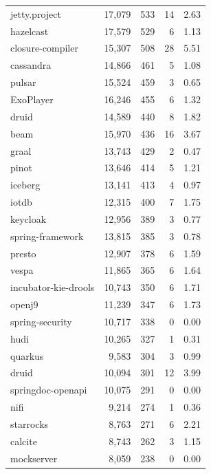 \begin{table}[!ht]
{\begin{tabular}{lrrrr}
jetty.project & 17,079 & 533 & 14 & 2.63 \\
hazelcast & 17,579 & 529 & 6 & 1.13 \\
closure-compiler & 15,307 & 508 & 28 & 5.51 \\
cassandra & 14,866 & 461 & 5 & 1.08 \\
pulsar & 15,524 & 459 & 3 & 0.65 \\
ExoPlayer & 16,246 & 455 & 6 & 1.32 \\
druid & 14,589 & 440 & 8 & 1.82 \\
beam & 15,970 & 436 & 16 & 3.67 \\
graal & 13,743 & 429 & 2 & 0.47 \\
pinot & 13,646 & 414 & 5 & 1.21 \\
iceberg & 13,141 & 413 & 4 & 0.97 \\
iotdb & 12,315 & 400 & 7 & 1.75 \\
keycloak & 12,956 & 389 & 3 & 0.77 \\
spring-framework & 13,815 & 385 & 3 & 0.78 \\
presto & 12,907 & 378 & 6 & 1.59 \\
vespa & 11,865 & 365 & 6 & 1.64 \\
incubator-kie-drools & 10,743 & 350 & 6 & 1.71 \\
openj9 & 11,239 & 347 & 6 & 1.73 \\
spring-security & 10,717 & 338 & 0 & 0.00 \\
hudi & 10,265 & 327 & 1 & 0.31 \\
quarkus & 9,583 & 304 & 3 & 0.99 \\
druid & 10,094 & 301 & 12 & 3.99 \\
springdoc-openapi & 10,075 & 291 & 0 & 0.00 \\
nifi & 9,214 & 274 & 1 & 0.36 \\
starrocks & 8,763 & 271 & 6 & 2.21 \\
calcite & 8,743 & 262 & 3 & 1.15 \\
mockserver & 8,059 & 238 & 0 & 0.00 \\
\bottomrule
\end{tabular}
}
\end{table}